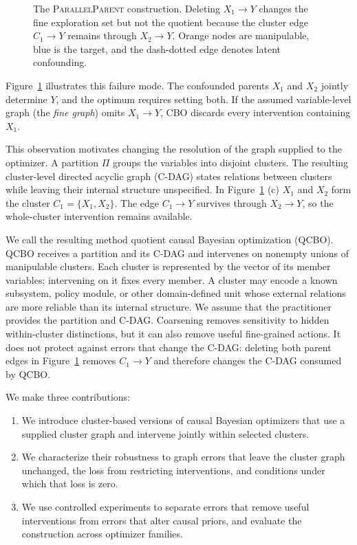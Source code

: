 \documentclass[twoside]{article}
\begin{document}
\begin{figure}[t]
  \centering
  
  \caption{The \textsc{ParallelParent} construction. Deleting
  $X_1\to Y$ changes the fine exploration set but not the quotient because the cluster edge $C_1\to Y$ remains through $X_2\to Y$. Orange nodes are manipulable, blue is the target, and the dash-dotted edge denotes latent
  confounding.}
  \label{fig:motivating}
\end{figure}

Figure~\ref{fig:motivating} illustrates this failure mode. The confounded parents $X_1$ and $X_2$ jointly determine $Y$, and the optimum requires setting both. If the assumed variable-level graph (the \emph{fine graph}) omits $X_1\to Y$, CBO discards every intervention containing $X_1$. 

This observation motivates changing the resolution of the graph supplied to the optimizer. A partition $\Pi$ groups the variables into disjoint clusters. The resulting cluster-level directed acyclic graph (C-DAG) states relations between clusters while leaving their internal structure unspecified. In Figure~\ref{fig:motivating} (c) $X_1$ and $X_2$ form the cluster $C_1=\{X_1,X_2\}$. The edge $C_1\to Y$ survives through $X_2\to Y$, so the whole-cluster intervention remains available.

We call the resulting method quotient causal Bayesian optimization (QCBO). QCBO receives a partition and its C-DAG and intervenes on nonempty unions of manipulable clusters. Each cluster is represented by the vector of its member variables; intervening on it fixes every member. A cluster may encode a known subsystem, policy module, or other domain-defined unit whose external relations are more reliable than its internal structure. We assume that the practitioner provides the partition and C-DAG. Coarsening removes sensitivity to hidden within-cluster distinctions, but it can also remove useful fine-grained actions. It does not protect against errors that change the C-DAG: deleting both parent edges in Figure~\ref{fig:motivating} removes $C_1\to Y$ and therefore changes the C-DAG consumed by QCBO.

We make three contributions: 

\begin{enumerate}
    \item We introduce cluster-based versions of causal Bayesian optimizers that use a supplied cluster graph and intervene jointly within selected clusters.
    \item We characterize their robustness to graph errors that leave the cluster graph unchanged, the loss from restricting interventions, and conditions under which that loss is zero.
    \item We use controlled experiments to separate errors that remove useful interventions from errors that alter causal priors, and evaluate the construction across optimizer families.
\end{enumerate}
\end{document}
